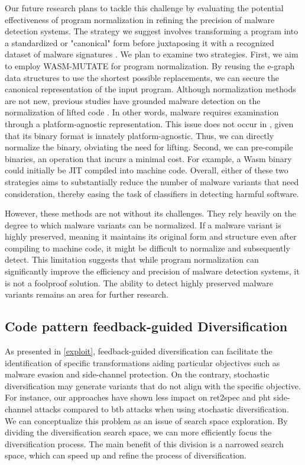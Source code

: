         
    Our future research plans to tackle this challenge by evaluating the potential effectiveness of program normalization in refining the precision of malware detection systems. 
    The strategy we suggest involves transforming a program into a standardized or "canonical" form before juxtaposing it with a recognized dataset of malware signatures \cite{seideman2023transformation}. 
    We plan to examine two strategies. 
    First, we aim to employ WASM-MUTATE for program normalization. 
    By reusing the e-graph data structures to use the shortest possible replacements, we can secure the canonical representation of the input program. 
    Although normalization methods are not new, previous studies have grounded malware detection on the normalization of lifted code \cite{Huang2017BinSequenceFA, 6234404, 10.1007/978-3-030-78120-0_5}. 
    In other words, malware requires examination through a platform-agnostic representation. 
    This issue does not occur in \Wasm, given that its binary format is innately platform-agnostic. 
    Thus, we can directly normalize the \Wasm binary, obviating the need for lifting. 
    Second, we can pre-compile \Wasm binaries, an operation that incurs a minimal cost. 
    For example, a Wasm binary could initially be JIT compiled into machine code. 
    Overall, either of these two strategies aims to substantially reduce the number of malware variants that need consideration, thereby easing the task of classifiers in detecting harmful software. 

    However, these methods are not without its challenges. 
    They rely heavily on the degree to which malware variants can be normalized.
    If a malware variant is highly preserved, meaning it maintains its original form and structure even after compiling to machine code, it might be difficult to normalize and subsequently detect. 
    This limitation suggests that while program normalization can significantly improve the efficiency and precision of malware detection systems, it is not a foolproof solution. 
    The ability to detect highly preserved malware variants remains an area for further research.
    


    
\subsection{Code pattern feedback-guided Diversification}
As presented in \autoref{exploit}, feedback-guided diversification can facilitate the identification of specific transformations aiding particular objectives such as malware evasion and side-channel protection. 
On the contrary, stochastic diversification may generate variants that do not align with the specific objective. 
For instance, our approaches have shown less impact on ret2spec and pht side-channel attacks compared to btb attacks when using stochastic diversification.
We can conceptualize this problem as an issue of search space exploration. 
By dividing the diversification search space, we can more efficiently focus the diversification process. 
The main benefit of this division is a narrowed search space, which can speed up and refine the process of diversification. 


